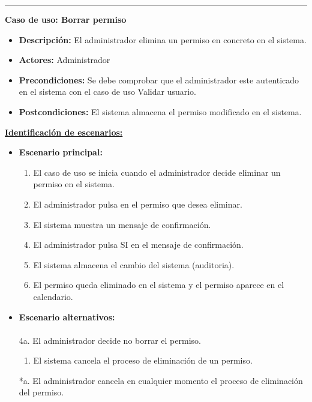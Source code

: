 \smallskip
\hrule height 1pt
\smallskip
\textbf{Caso de uso: Borrar permiso}
\begin{itemize}\renewcommand{\labelitemi}{$\cdot$}
 \item \textbf{Descripción:} El administrador elimina un permiso en concreto en el sistema.
  \item \textbf{Actores:} Administrador 
  \item \textbf{Precondiciones:} Se debe comprobar que el administrador este autenticado en el sistema con el caso de uso Validar usuario.
  \item \textbf{Postcondiciones:} El sistema almacena el permiso modificado en el sistema.
\end{itemize}
\underline{\textbf{Identificación de escenarios:}}
\begin{itemize}\renewcommand{\labelitemi}{$\circ$}
 \item \textbf{Escenario principal:}
         \begin{enumerate}
          \item El caso de uso se inicia cuando el administrador decide eliminar un permiso en el sistema.
	  \item El administrador pulsa en el permiso que desea eliminar.
	  \item El sistema muestra un mensaje de confirmación.
          \item El administrador pulsa SI en el mensaje de confirmación.
 	  \item El sistema almacena el cambio del sistema (auditoria).
          \item El permiso queda eliminado en el sistema y el permiso aparece en el calendario.
         \end{enumerate}
  \item \textbf{Escenario alternativos:}\\\\
		4a. El administrador decide no borrar el permiso.
  			\begin{enumerate}
  			\item El sistema cancela el proceso de eliminación de un permiso.
  			\end{enumerate}
          *a. El administrador cancela en cualquier momento el proceso de eliminación del permiso.
\end{itemize}


